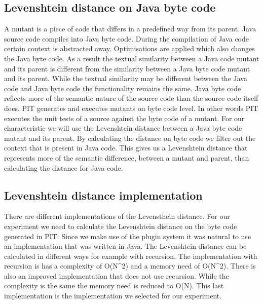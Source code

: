 \documentclass[../main]{subfiles}
\begin{document}
\subsection{Levenshtein distance on Java byte code}
A mutant is a piece of code that differs in a predefined way from its parent.
Java source code compiles into Java byte code.
During the compilation of Java code certain context is abstracted away\cite{byteCodeEngineering}.
Optimisations are applied which also changes the Java byte code\cite{byteCodeEngineering}.
As a result the textual similarity between a Java code mutant and its parent is different from the similarity between a Java byte code mutant and its parent.
While the textual similarity may be different between the Java code and Java byte code the functionality remains the same.
Java byte code reflects more of the semantic nature of the source code than the source code itself does. 
PIT generates and executes mutants on byte code level\cite{pitestBytecode}. 
In other words PIT executes the unit tests of a source against the byte code of a mutant.
\newline
For our characteristic we will use the Levenshtein distance between a Java byte code mutant and its parent.
By calculating the distance on byte code we filter out the context that is present in Java code.
This gives us a Levenshtein distance that represents more of the semantic difference, between a mutant and parent, than calculating the distance for Java code.


\subsection{Levenshtein distance implementation}
There are different implementations of the Levensthein distance.
For our experiment we need to calculate the Levenshtein distance on the byte code generated in PIT.
Since we make use of the plugin system it was natural to use an implementation that was written in Java.
The Levenshtein distance can be calculated in different ways for example with recursion.
The implementation with recursion is has a complexity of O(N\^{}2) and a memory need of O(N\^{}2).
There is also an improved implementation that does not use recursion.
While the complexity is the same the memory need is reduced to O(N).
This last implementation is the implementation we selected for our experiment.
\end{document}
